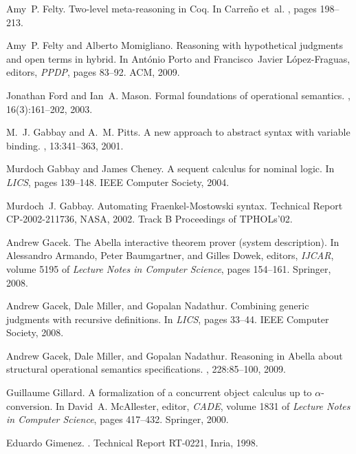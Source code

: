 \documentclass[final]{svjour3}
\begin{document}
\begin{thebibliography}{100}
Amy~P. Felty.
\newblock Two-level meta-reasoning in {C}oq.
\newblock In Carre{\~n}o et~al. \cite{DBLP:conf/tphol/2002}, pages 198--213.

Amy~P. Felty and Alberto Momigliano.
\newblock Reasoning with hypothetical judgments and open terms in hybrid.
\newblock In Ant{\'o}nio Porto and Francisco~Javier L{\'o}pez-Fraguas, editors,
  {\em PPDP}, pages 83--92. ACM, 2009.

Jonathan Ford and Ian~A. Mason.
\newblock Formal foundations of operational semantics.
, 16(3):161--202, 2003.

M.~J. Gabbay and A.~M. Pitts.
\newblock A new approach to abstract syntax with variable binding.
, 13:341--363, 2001.

Murdoch Gabbay and James Cheney.
\newblock A sequent calculus for nominal logic.
\newblock In {\em LICS}, pages 139--148. IEEE Computer Society, 2004.

Murdoch~J. Gabbay.
\newblock Automating {F}raenkel-{M}ostowski syntax.
\newblock Technical Report CP-2002-211736, NASA, 2002.
\newblock Track B Proceedings of TPHOLs'02.

Andrew Gacek.
\newblock The {Abella} interactive theorem prover (system description).
\newblock In Alessandro Armando, Peter Baumgartner, and Gilles Dowek, editors,
  {\em IJCAR}, volume 5195 of {\em Lecture Notes in Computer Science}, pages
  154--161. Springer, 2008.

Andrew Gacek, Dale Miller, and Gopalan Nadathur.
\newblock Combining generic judgments with recursive definitions.
\newblock In {\em LICS}, pages 33--44. IEEE Computer Society, 2008.

Andrew Gacek, Dale Miller, and Gopalan Nadathur.
\newblock Reasoning in {Abella} about structural operational semantics
  specifications.
, 228:85--100, 2009.

Guillaume Gillard.
\newblock A formalization of a concurrent object calculus up to
  $\alpha$-conversion.
\newblock In David~A. McAllester, editor, {\em CADE}, volume 1831 of {\em
  Lecture Notes in Computer Science}, pages 417--432. Springer, 2000.

Eduardo Gimenez.
.
\newblock Technical Report RT-0221, Inria, 1998.


\end{thebibliography}
\end{document}
